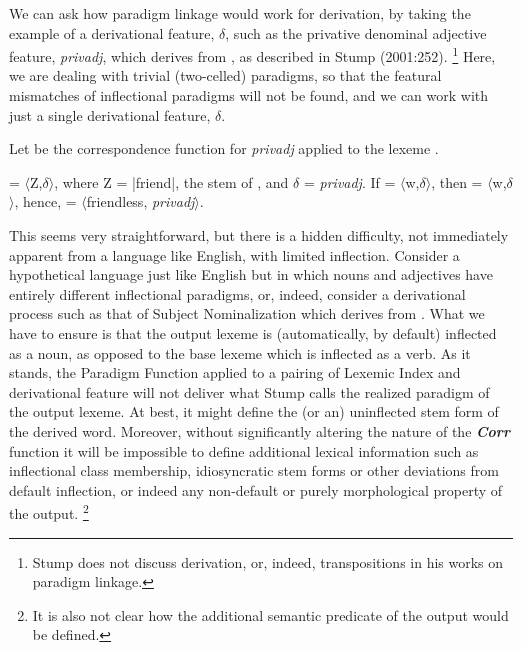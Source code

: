 \documentclass[output=paper,
modfonts
]{LSP/langsci}
\begin{document}
We can ask how  paradigm linkage would work for derivation, by taking the example of a derivational feature, $\delta$, such as the privative denominal adjective feature, \textit{privadj}, which derives  from , as described in Stump (2001:252).%
\footnote{Stump does not discuss derivation, or, indeed, transpositions in his works on paradigm linkage.} %
Here, we are  dealing with trivial (two-celled) paradigms, so that the featural mismatches of inflectional paradigms will not be found, and we can work with just a single derivational feature, $\delta$. 

\begin{exe} \ex \label{friendless}

Let  be the correspondence function for \textit{privadj} applied to the lexeme . 

 = $\langle$Z,$\delta$$\rangle$, where Z = |friend|, the stem of , and $\delta$ = \textit{privadj}.  If  = $\langle$w,$\delta$$\rangle$, then \PF{\pounds,$\delta$} = $\langle$w,$\delta$$\rangle$, hence,  = $\langle$friendless, \textit{privadj}$\rangle$. 
\end{exe}
This seems very straightforward, but there is a hidden difficulty, not immediately apparent from a language like English, with limited inflection. Consider a hypothetical language just like English but in which nouns and adjectives have entirely different inflectional paradigms, or, indeed, consider a derivational process such as that of Subject Nominalization which derives  from . What we have to ensure is that the output lexeme is (automatically, by default) inflected as a noun, as opposed to the base lexeme which is inflected as a verb. As it stands, the Paradigm Function applied to a pairing of Lexemic Index and derivational feature will not deliver what Stump calls the realized paradigm of the output lexeme. At best, it might define the (or an) uninflected stem form of the derived word. Moreover, without significantly altering the nature of the \textbf{\textit{Corr}} function it will be impossible to define additional lexical information such as inflectional class membership, idiosyncratic stem forms or other deviations from default inflection, or indeed any non-default or purely morphological property of the output.%
\footnote{It is also not clear how the additional semantic predicate of the output would be defined.}%
\end{document}

